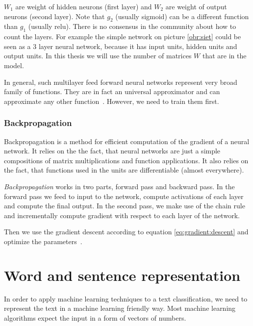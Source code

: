     $W_1$ are weight of hidden neurons (first layer) and $W_2$ are weight of output neurons (second layer). Note that $g_2$ (usually sigmoid) can be a different function than $g_1$ (usually relu).
    There is no consensus in the community about how to count the layers. 
    For example the simple network on picture \ref{obr:siet} could be seen as a $3$ layer neural network,
    because it has input units, hidden units and output units.
    In this thesis we will use the number of matrices $W$ that are in the model.
    
    In general, such multilayer feed forward neural networks represent very broad family of functions.
    They are in fact an universal approximator and can approximate any other function~\cite{cybenko1989approximation}.
    However, we need to train them first.
    
    \subsubsection{Backpropagation} \label{sec:backprop}
    
    Backpropagation is a method for efficient computation of the gradient of a neural network.
    It relies on the the fact, that neural networks are just a simple compositions of matrix multiplications and function applications. 
    It also relies on the fact, that functions used in the units are differentiable (almost everywhere).
    
    \textit{Backpropagation} works in two parts, forward pass and backward pass.
    In the forward pass we feed to input to the network, compute activations of each layer and compute the final output.
    In the second pass, we make use of the chain rule and incrementally compute gradient with respect to each layer of the network.
    
    Then we use the gradient descent according to equation \ref{eq:gradient:descent} and optimize the parameters~\cite{rumelhart1986david}.
    
    
    
\section{Word and sentence representation}

    In order to apply machine learning techniques to a text classification, 
    we need to represent the text in a machine learning friendly way.
    Most machine learning algorithms expect the input in a form of vectors of numbers. 
    

